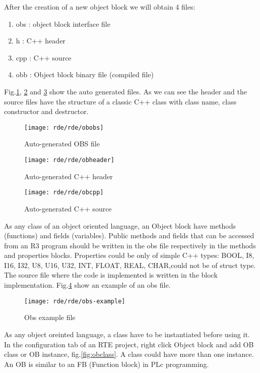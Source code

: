 After the creation of a new object block we will obtain 4 files:
\begin{enumerate}
	\item obs : object block interface file
	\item h : C++ header
	\item cpp : C++ source
	\item obb : Object block binary file (compiled file)
\end{enumerate}

Fig.\ref{fig:obobs}, \ref{fig:obheader} and \ref{fig:obcpp} show the auto generated files. As we can see the header and the source files have the structure of a classic C++ class with class name, class constructor and destructor.
\begin{figure}[h]
	\centering\texttt{[image: rde/rde/obobs]}
	\caption{Auto-generated OBS file}
	\label{fig:obobs}
\end{figure}

\begin{figure}[h]
	\centering\texttt{[image: rde/rde/obheader]}
	\caption{Auto-generated C++ header}
	\label{fig:obheader}
\end{figure}

\begin{figure}[h]
	\centering\texttt{[image: rde/rde/obcpp]}
	\caption{Auto-generated C++ source}
	\label{fig:obcpp}
\end{figure}

As any class of an object oriented language, an Object block have methods (functions) and fields (variables). Public methods and fields that can be accessed from an R3 program should be written in the obs file respectively in the methods and properties blocks.
Properties could be only of simple C++ types: BOOL, I8, I16, I32, U8, U16, U32, INT, FLOAT, REAL, CHAR,could not be of struct type.
The source file where the code is implemented is written in the block implementation. Fig.\ref{fig:obsex} show an example of an obs file.

\begin{figure}[h]
	\centering\texttt{[image: rde/rde/obs-example]}
	\caption{Obs example file}
	\label{fig:obsex}
\end{figure}

As any object oreinted language, a class have to be instantiated before using it. In the configuration tab of an RTE project, right click Object block and add OB class or OB instance, fig.\ref{fig:obclass}. A class could have more than one instance. An OB is similar to an FB (Function block) in PLc programming.

